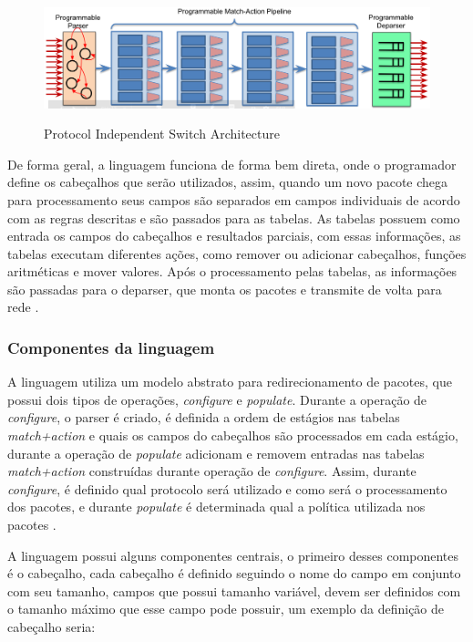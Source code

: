 \documentclass[
    12pt,
    openright, 
    oneside,
    a4paper,
    french,
    english,
    brazil
    ]{facom-ufu-abntex2}
\theoremstyle{definition}
\begin{document}

\begin{figure}[ht]
    \caption{Protocol Independent Switch Architecture \cite{paxos14spec}}
    \centering
    \includegraphics[width=\textwidth]{images/pisa.png}
    \label{fig:pisa-model}
\end{figure}

De forma geral, a linguagem funciona de forma bem direta, onde o programador define
os cabeçalhos que serão utilizados, assim, quando um novo pacote chega para processamento
seus campos são separados em campos individuais de acordo com as regras descritas e são
passados para as tabelas. As tabelas possuem como entrada os campos do cabeçalhos e 
resultados parciais, com essas informações, as tabelas executam diferentes ações,
como remover ou adicionar cabeçalhos, funções aritméticas e mover valores. Após o 
processamento pelas tabelas, as informações são passadas para o deparser, que 
monta os pacotes e transmite de volta para rede \cite{p4LangTutorial}.

\subsubsection{Componentes da linguagem}

A linguagem utiliza um modelo abstrato para redirecionamento de pacotes, que possui
dois tipos de operações, \textit{configure} e \textit{populate}. Durante a operação
de \textit{configure}, o parser é criado, é definida a ordem de estágios nas tabelas
\textit{match+action} e quais os campos do cabeçalhos são processados em cada estágio,
durante a operação de \textit{populate} adicionam e removem entradas nas tabelas
\textit{match+action} construídas durante operação de \textit{configure}. Assim,
durante \textit{configure}, é definido qual protocolo será utilizado e como será
o processamento dos pacotes, e durante \textit{populate} é determinada qual a 
política utilizada nos pacotes \cite{bosshart2014p4}.

A linguagem possui alguns componentes centrais, o primeiro desses componentes 
é o cabeçalho, cada cabeçalho é definido seguindo o nome do campo em conjunto 
com seu tamanho, campos que possui tamanho variável, devem ser definidos com o
tamanho máximo que esse campo pode possuir, um exemplo da definição de cabeçalho
seria:
\end{document}
